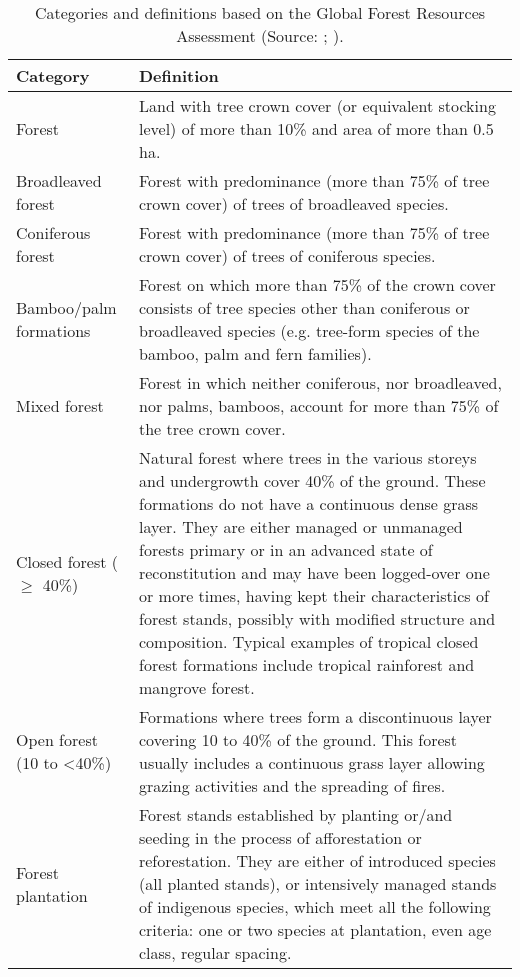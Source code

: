 \begin{spacing}{1.0}
\begin{longtable}[h!]{ p{3.5cm} p{10.5cm} }

    \caption[Global Forest Resources Assessment categories and definitions.]{Categories and definitions based on the Global Forest Resources Assessment (Source: \cite{fao_2005_2005}; \cite{fao_2010_2010}).}
    \label{tab: intro-table2.1}\\
    
    \toprule
    Category & Definition \\
    \midrule
    \endhead

    Forest & Land with tree crown cover (or equivalent stocking level) of more than 10\% and area of more than 0.5 ha. \\[5pt]
    Broadleaved forest & Forest with predominance (more than 75\% of tree crown cover) of trees of broadleaved species.\\[5pt]
    Coniferous forest & Forest with predominance (more than 75\% of tree crown cover) of trees of coniferous species.\\[5pt]
	Bamboo/palm formations & Forest on which more than 75\% of the crown cover consists of tree species other than coniferous or broadleaved species (e.g. tree-form species of the bamboo, palm and fern families).\\[5pt]
	Mixed forest & Forest in which neither coniferous, nor broadleaved, nor palms, bamboos, account for more than 75\% of the tree crown cover.\\[5pt]
	Closed forest ($\geq$ 40\%) & Natural forest where trees in the various storeys and undergrowth cover 40\% of the ground. These formations do not have a continuous dense grass layer. They are either managed or unmanaged forests primary or in an advanced state of reconstitution and may have been logged-over one or more times, having kept their characteristics of forest stands, possibly with modified structure and composition. Typical examples of tropical closed forest formations include tropical rainforest and mangrove forest.\\[5pt]
	Open forest (10 to \textless 40\%) & Formations where trees form a discontinuous layer covering 10 to 40\% of the ground. This forest usually includes a continuous grass layer allowing grazing activities and the spreading of fires.\\[5pt]
	Forest plantation & Forest stands established by planting or/and seeding in the process of afforestation or reforestation. They are either of introduced species (all planted stands), or intensively managed stands of indigenous species, which meet all the following criteria: one or two species at plantation, even age class, regular spacing.\\[5pt]

\end{longtable}
\end{spacing}
